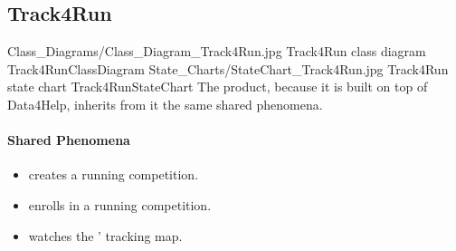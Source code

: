 \documentclass[../../rasd.tex]{subfiles}
\begin{document}
		\subsection{Track4Run\label{sect:2.1.3}}

			\image {10cm} {Class_Diagrams/Class_Diagram_Track4Run.jpg} {Track4Run class diagram} {Track4RunClassDiagram}
			\image {10cm} {State_Charts/StateChart_Track4Run.jpg} {Track4Run state chart} {Track4RunStateChart}
			The product, because it is built on top of Data4Help, inherits from it the same shared phenomena.

			\paragraph{Shared Phenomena}
			\begin{itemize}
				\item {} creates a running competition.
				\item {} enrolls in a running competition.
				\item {} watches the ' tracking map.		
			\end{itemize}
\end{document}
